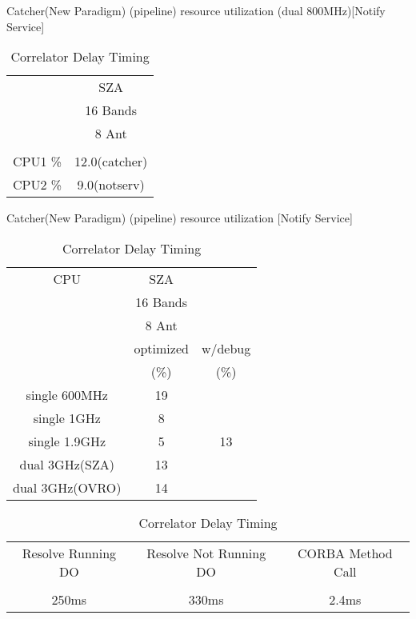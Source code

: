\documentclass[11pt]{article}
\begin{document}
\begin{table}
\caption{Catcher(New Paradigm) (pipeline) resource utilization (dual 800MHz)[Notify Service]}
\label{tab:pipeDOCPUresource3}
\begin{center}
\begin{tabular}{|c|c|}
\hline
& SZA \\
& 16 Bands \\
& 8 Ant \\
& \\
\hline\hline
CPU1 \% & 12.0(catcher)  \\
CPU2 \% &  9.0(notserv)  \\
\hline
\end{tabular}
\end{center}
\vskip 5mm

\caption{Catcher(New Paradigm) (pipeline) resource utilization [Notify Service]}
\label{tab:pipeDOCPUresource4}
\begin{center}
\begin{tabular}{|c|c|c|}
\hline
CPU    & SZA       & \\
       & 16 Bands  & \\
       & 8 Ant     & \\
       & optimized & w/debug \\
       & (\%)      &  (\%) \\
\hline\hline
single 600MHz           & 19 & \\
single 1GHz             &  8 & \\
single 1.9GHz           &  5 & 13 \\
dual   3GHz(SZA)        & 13 & \\
dual   3GHz(OVRO)       & 14 & \\
\hline
\end{tabular}
\end{center}
\vskip 5mm

\caption{Correlator Delay Timing}
\label{tab:corrDOdelay}
\begin{center}
\begin{tabular}{|c|c|c|}
\hline
Resolve Running DO & Resolve Not Running DO   & CORBA Method Call \\
&& \\
\hline\hline
250ms & 330ms & 2.4ms \\
\hline
\end{tabular}
\end{center}
\end{table}
\end{document}
